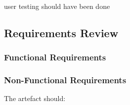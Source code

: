 user testing should have been done

\subsection{Requirements Review} \label{s-i--requirements-review}


\subsubsection{Functional Requirements} \label{s-i--requirements--functional}

\subsubsection{Non-Functional Requirements} \label{s-i--requirements--non-functional}

The artefact should:

